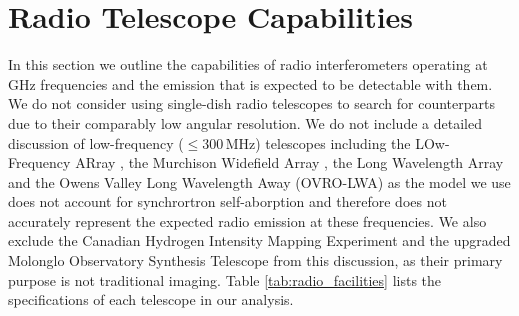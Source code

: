 
\section{Radio Telescope Capabilities}
\label{sec:radio_telescopes}
In this section we outline the capabilities of radio interferometers operating at GHz frequencies and the emission that is expected to be detectable with them. We do not consider using single-dish radio telescopes to search for counterparts due to their comparably low angular resolution. We do not include a detailed discussion of low-frequency ($\leq 300$\,MHz) telescopes including the LOw-Frequency ARray \citep[LOFAR;][]{2013A&A...556A...2V}, the Murchison Widefield Array \citep[MWA;][]{2013PASA...30....7T}, the Long Wavelength Array \citep[LWA;][]{2012JAI.....150004T} and the Owens Valley Long Wavelength Away  (OVRO-LWA) as the model we use does not account for synchrortron self-aborption and therefore does not accurately represent the expected radio emission at these frequencies. We also exclude the Canadian Hydrogen Intensity Mapping Experiment \citep[CHIME;][]{2018ApJ...863...48C} and the upgraded Molonglo Observatory Synthesis Telescope \citep[UTMOST;][]{2017PASA...34...45B} from this discussion, as their primary purpose is not traditional imaging. Table \ref{tab:radio_facilities} lists the specifications of each telescope in our analysis.

